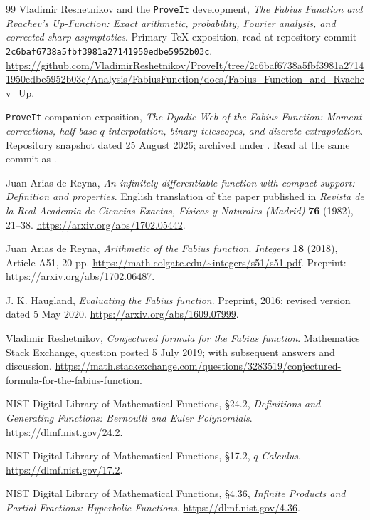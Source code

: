 \documentclass[11pt,oneside]{article}
\theoremstyle{definition}\newtheorem{definition}[theorem]{Definition}
\theoremstyle{remark}\newtheorem{remark}[theorem]{Remark}
\begin{document}
\begingroup
\small
\begin{thebibliography}{99}
\setlength{\itemsep}{3pt}
Vladimir Reshetnikov and the \texttt{ProveIt} development,
\emph{The Fabius Function and Rvachev's Up-Function: Exact arithmetic,
probability, Fourier analysis, and corrected sharp asymptotics}.
Primary TeX exposition, read at repository commit
\nolinkurl{2c6baf6738a5fbf3981a27141950edbe5952b03c}.
\url{https://github.com/VladimirReshetnikov/ProveIt/tree/2c6baf6738a5fbf3981a27141950edbe5952b03c/Analysis/FabiusFunction/docs/Fabius_Function_and_Rvachev_Up}.

\texttt{ProveIt} companion exposition,
\emph{The Dyadic Web of the Fabius Function: Moment corrections,
half-base $q$-interpolation, binary telescopes, and discrete extrapolation}.
Repository snapshot dated 25 August 2026; archived under
.
Read at the same commit as \cite{repo}.

Juan Arias de Reyna,
\emph{An infinitely differentiable function with compact support:
Definition and properties}. English translation of the paper published in
\emph{Revista de la Real Academia de Ciencias Exactas, F\'isicas y Naturales
(Madrid)} \textbf{76} (1982), 21--38.
\url{https://arxiv.org/abs/1702.05442}.

Juan Arias de Reyna,
\emph{Arithmetic of the Fabius function}.
\emph{Integers} \textbf{18} (2018), Article A51, 20 pp.
\url{https://math.colgate.edu/~integers/s51/s51.pdf}.
Preprint: \url{https://arxiv.org/abs/1702.06487}.

J. K. Haugland,
\emph{Evaluating the Fabius function}.
Preprint, 2016; revised version dated 5 May 2020.
\url{https://arxiv.org/abs/1609.07999}.

Vladimir Reshetnikov,
\emph{Conjectured formula for the Fabius function}.
Mathematics Stack Exchange, question posted 5 July 2019; with subsequent
answers and discussion.
\url{https://math.stackexchange.com/questions/3283519/conjectured-formula-for-the-fabius-function}.

NIST Digital Library of Mathematical Functions,
\S24.2, \emph{Definitions and Generating Functions: Bernoulli and Euler
Polynomials}.
\url{https://dlmf.nist.gov/24.2}.

NIST Digital Library of Mathematical Functions,
\S17.2, \emph{$q$-Calculus}.
\url{https://dlmf.nist.gov/17.2}.

NIST Digital Library of Mathematical Functions,
\S4.36, \emph{Infinite Products and Partial Fractions: Hyperbolic Functions}.
\url{https://dlmf.nist.gov/4.36}.
\end{thebibliography}
\endgroup
\end{document}
